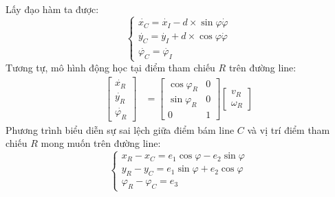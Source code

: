           \hspace*{0.6cm}Lấy đạo hàm ta được:
          \begin{equation}
               \begin{cases}
                    \dot{x_C} = \dot{x_I} - d \times \sin \varphi \dot{\varphi} \\[0.5em]
                    \dot{y_C} = \dot{y_I} + d \times \cos \varphi \dot{\varphi} \\[0.5em]
                    \dot{\varphi_C} = \dot{\varphi_I}
               \end{cases}
               \label{c5_e3}            
          \end{equation}
          \hspace*{0.6cm}Tương tự, mô hình động học tại điểm tham chiếu $R$ trên đường line:
          \begin{align}
               \begin{bmatrix}
                    \dot{x_R} \\
                    \dot{y_R} \\
                    \dot{\varphi_R}
                    \end{bmatrix} &= \begin{bmatrix}
                    \cos\varphi_R & 0 \\
                    \sin\varphi_R & 0 \\
                    0 & 1
                    \end{bmatrix} \begin{bmatrix}
                    v_R \\
                    \omega_R
               \end{bmatrix}
               \label{c5_e4}
          \end{align}
          \hspace*{0.6cm}Phương trình biểu diễn sự sai lệch giữa điểm bám line $C$ và vị trí điểm tham chiếu $R$ mong muốn trên đường line:
          \begin{equation}
               \begin{cases}
                    x_R - x_C = e_1 \cos \varphi - e_2 \sin \varphi \\[0.5em]
                    y_R - y_C = e_1 \sin \varphi + e_2 \cos \varphi \\[0.5em]
                    \varphi_R - \varphi_C = e_3
               \end{cases}    
               \label{c5_e5}           
          \end{equation}
